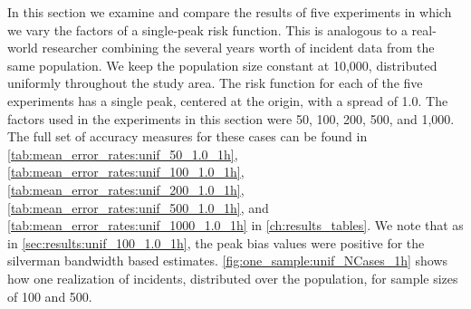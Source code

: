 In this section we examine and compare the results of five experiments in which we vary the \glspl{factor}
of a single-peak risk function.
This is analogous to a real-world researcher combining the several years worth of incident data from the same population.
We keep the population size constant at 10,000, distributed uniformly throughout the study area.
The risk function for each of the five experiments has a single peak,
centered at the origin,
with a \gls{spread} of 1.0.
The \glspl{factor} used in the experiments in this section were 50, 100, 200, 500, and 1,000.
The full set of accuracy measures for these cases can be found in \autoref{tab:mean_error_rates:unif_50_1.0_1h}, \autoref{tab:mean_error_rates:unif_100_1.0_1h}, \autoref{tab:mean_error_rates:unif_200_1.0_1h}, \autoref{tab:mean_error_rates:unif_500_1.0_1h}, and \autoref{tab:mean_error_rates:unif_1000_1.0_1h} in \autoref{ch:results_tables}.
We note that as in \cref{sec:results:unif_100_1.0_1h}, the \gls{peak bias} values were positive for the \gls{silverman} bandwidth based estimates.
\autoref{fig:one_sample:unif_NCases_1h} shows how one realization of incidents, distributed over the population, for sample sizes of 100 and 500.

